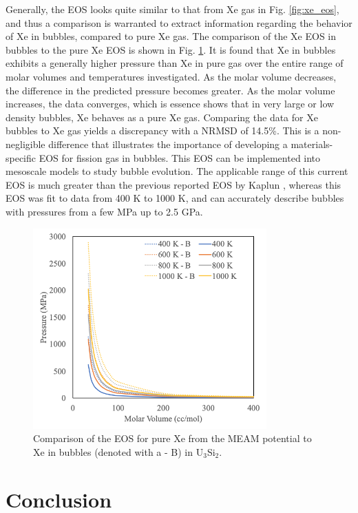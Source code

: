 \documentclass[review]{elsarticle}
\begin{document}
Generally, the EOS looks quite similar to that from Xe gas in Fig. \ref{fig:xe_eos}, and thus a comparison is warranted to extract information regarding the behavior of Xe in bubbles, compared to pure Xe gas. The comparison of the Xe EOS in bubbles to the pure Xe EOS is shown in Fig. \ref{fig:eos_comp}. It is found that Xe in bubbles exhibits a generally higher pressure than Xe in pure gas over the entire range of molar volumes and temperatures investigated. As the molar volume decreases, the difference in the predicted pressure becomes greater. As the molar volume increases, the data converges, which is essence shows that in very large or low density bubbles, Xe behaves as a pure Xe gas. Comparing the data for Xe bubbles to Xe gas yields a discrepancy with a NRMSD of 14.5\%. This is a non-negligible difference that illustrates the importance of developing a materials-specific EOS for fission gas in bubbles. This EOS can be implemented into mesoscale models to study bubble evolution. The applicable range of this current EOS is much greater than the previous reported EOS by Kaplun \cite{kaplun2003}, whereas this EOS was fit to data from 400 K to 1000 K, and can accurately describe bubbles with pressures from a few MPa up to 2.5 GPa.

\begin{figure}[hbt]
	\centering
	\includegraphics[width=0.8\textwidth]{xe_eos_compa.png}
 \caption{Comparison of the EOS for pure Xe from the MEAM potential to Xe in bubbles (denoted with a - B) in U$_3$Si$_2$.}\label{fig:eos_comp}
\end{figure}

\FloatBarrier

\section{Conclusion}
\end{document}
